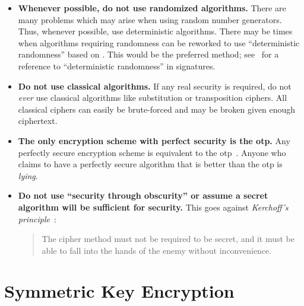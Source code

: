 \begin{itemize}
\item \textbf{Whenever possible, do not use randomized algorithms.}
    There are many problems which may arise when using
        random number generators.
    Thus, whenever possible, use deterministic algorithms.
    There may be times when algorithms requiring randomness
    can be reworked to use ``deterministic randomness'' based on
    .
    This would be the preferred method;
    see~\cite{rfc6979} for a reference to ``deterministic randomness''
    in \glspl{signature}.

\item \textbf{Do not use classical algorithms.}
    If any real security is required, do not \emph{ever} use
    classical algorithms like substitution or transposition ciphers.
    All classical ciphers can easily be brute-forced and may
    be broken given enough ciphertext.

\item \textbf{The only \gls{encryption scheme} with \gls{perfect security}
    is the \gls{otp}.}
    Any perfectly secure encryption scheme is equivalent to the
    \gls{otp}~\cite[Theorems 2.10 and 2.11]{IntroModernCrypto}.
    Anyone who claims to have a perfectly secure algorithm
    that is better than the \gls{otp} is \emph{lying}.

\item \textbf{Do not use ``security through obscurity'' or
    assume a secret algorithm will be sufficient for security.}
    This goes against
    \emph{Kerchoff's principle}~\cite[Page 5]{IntroModernCrypto}:

\begin{quote}
    The cipher method must not be required to be secret,
    and it must be able to fall into the hands of the enemy
    without inconvenience.
\end{quote}

\end{itemize}

\section{Symmetric Key Encryption}

